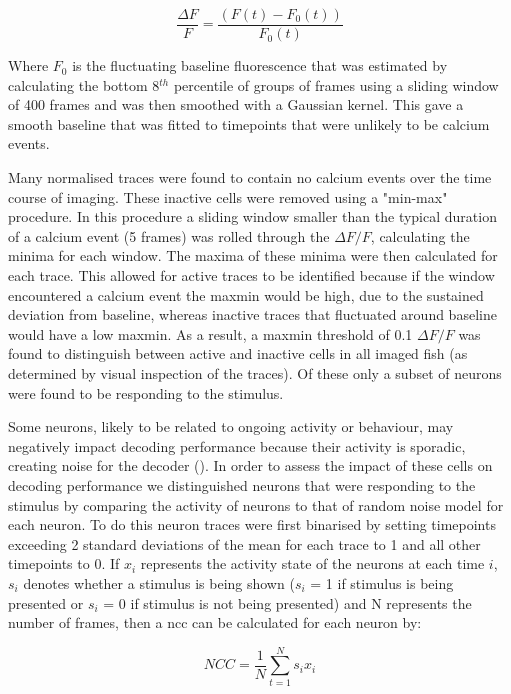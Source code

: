 \begin{equation}
    \frac{\Delta F}{F} = \frac{(F(t) - F_{0}(t))}{F_{0}(t)}
\end{equation}

Where $F_{0}$ is the fluctuating baseline fluorescence that was estimated by calculating the bottom 8$^{th}$ percentile of groups of frames using a sliding window of 400 frames and was then smoothed with a Gaussian kernel.  This gave a smooth baseline that was fitted to timepoints that were unlikely to be calcium events. 

Many normalised traces were found to contain no calcium events over the time course of imaging. These inactive cells were removed using a "min-max" procedure. In this procedure a sliding window smaller than the typical duration of a calcium event (5 frames) was rolled through the $\Delta F/F$, calculating the minima for each window. The maxima of these minima were then calculated for each trace. This allowed for active traces to be identified because if the window encountered a calcium event the maxmin would be high, due to the sustained deviation from baseline, whereas inactive traces that fluctuated around baseline would have a low maxmin. As a result, a maxmin threshold of 0.1 $\Delta F/F$ was found to distinguish between active and inactive cells in all imaged fish (as determined by visual inspection of the traces). Of these only a subset of neurons were found to be responding to the stimulus.

Some neurons, likely to be related to ongoing activity or behaviour, may negatively impact decoding performance because their activity is sporadic, creating noise for the decoder (\cite{Kahn2015ANeurons}). In order to assess the impact of these cells on decoding performance we distinguished neurons that were responding to the stimulus by comparing the activity of neurons to that of random noise model for each neuron. To do this neuron traces were first binarised by setting timepoints exceeding 2 standard deviations of the mean for each trace to 1 and all other timepoints to  0. If $x_{i}$ represents the activity state of the neurons at each time $i$, $s_{i}$ denotes whether a stimulus is being shown ($s_{i}$ = 1 if stimulus is being presented or $s_{i}$ = 0 if stimulus is not being presented) and N represents the number of frames, then a \gls{ncc} can be calculated for each neuron by:

\begin{equation}
    NCC = \frac{1}{N} \sum_{t = 1}^{N}s_{i}x_{i}
\end{equation}

